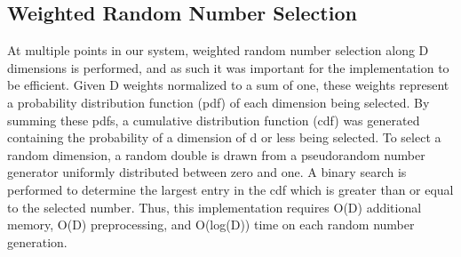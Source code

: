 \subsection{Weighted Random Number Selection}
\label{sec:rng}

At multiple points in our system, weighted random number selection along D dimensions is performed, and as such it was important for the implementation to be efficient.  Given D weights normalized to a sum of one, these weights represent a probability distribution function (pdf) of each dimension being selected.  By summing these pdfs, a cumulative distribution function (cdf) was generated containing the probability of a dimension of d or less being selected.  To select a random dimension, a random double is drawn from a pseudorandom number generator uniformly distributed between zero and one.  A binary search is performed to determine the largest entry in the cdf which is greater than or equal to the selected number.  Thus, this implementation requires O(D) additional memory, O(D) preprocessing, and O(log(D)) time on each random number generation.